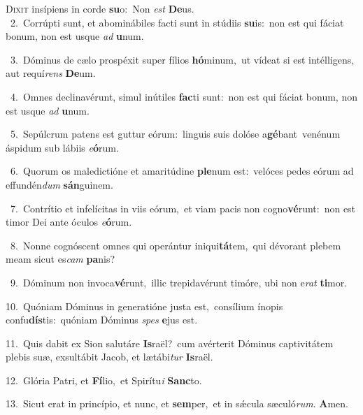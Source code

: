 \lettrine{\initial\textcolor{\initialcolor}{D}}{ixit} insípiens in corde \textbf{su}\-o:~\star Non \textit{est} \textbf{De}\-us.\\
{\numbfont\textcolor{\numbcolor}{~2.}}~Corrúpti sunt, et abominábiles facti sunt in stúdiis \textbf{su}\-is:~\star non est qui fáciat bonum, non est usque \textit{ad} \textbf{u}\-num.\par
{\numbfont\textcolor{\numbcolor}{~3.}}~Dóminus de cælo prospéxit super fílios \textbf{hó}\-minum,~\star ut vídeat si est intélligens, aut requí\textit{rens} \textbf{De}\-um.\par
{\numbfont\textcolor{\numbcolor}{~4.}}~Omnes declinavérunt, simul inútiles \textbf{fac}\-ti sunt:~\star non est qui fáciat bonum, non est usque \textit{ad} \textbf{u}\-num.\par
{\numbfont\textcolor{\numbcolor}{~5.}}~Sepúlcrum patens est guttur eórum:~\dagger linguis suis dolóse a\-\textbf{gé}\-bant~\star venénum áspidum sub lábiis \textit{e}\-\textbf{ó}rum.\par
{\numbfont\textcolor{\numbcolor}{~6.}}~Quorum os maledictióne et amaritúdine \textbf{ple}\-num est:~\star velóces pedes eórum ad effundén\textit{dum} \textbf{sán}\-guinem.\par
{\numbfont\textcolor{\numbcolor}{~7.}}~Contrítio et infelícitas in viis eórum,~\dagger et viam pacis non cogno\-\textbf{vé}\-runt:~\star non est timor Dei ante óculos \textit{e}\-\textbf{ó}rum.\par
{\numbfont\textcolor{\numbcolor}{~8.}}~Nonne cognóscent omnes qui operántur iniqui\-\textbf{tá}\-tem,~\star qui dévorant plebem meam sicut es\textit{cam} \textbf{pa}\-nis?\par
{\numbfont\textcolor{\numbcolor}{~9.}}~Dóminum non invoca\-\textbf{vé}\-runt,~\star illic trepidavérunt timóre, ubi non e\textit{rat} \textbf{ti}\-mor.\par
{\numbfont\textcolor{\numbcolor}{10.}}~Quóniam Dóminus in generatióne justa est,~\dagger consílium ínopis confu\-\textbf{dís}\-tis:~\star quóniam Dóminus \textit{spes} \textbf{e}\-jus est.\par
{\numbfont\textcolor{\numbcolor}{11.}}~Quis dabit ex Sion salutáre \textbf{Is}\-raël?~\star cum avérterit Dóminus captivitátem plebis suæ, exsultábit Jacob, et lætábi\textit{tur} \textbf{Is}\-raël.\par
{\numbfont\textcolor{\numbcolor}{12.}}~Glória Patri, et \textbf{Fí}\-lio,~\star et Spirítu\textit{i} \textbf{Sanc}\-to.\par
{\numbfont\textcolor{\numbcolor}{13.}}~Sicut erat in princípio, et nunc, et \textbf{sem}\-per,~\star et in sǽcula sæculó\-\textit{rum}\-. \textbf{A}\-men.\par
